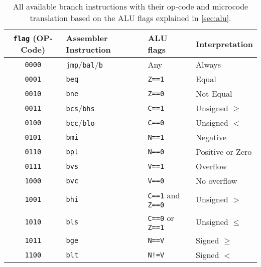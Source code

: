 \begin{table}
  \centering
  \renewcommand{\arraystretch}{1.25}
  \caption{All available branch instructions with their op-code and microcode translation based on the \gls{ALU} flags explained in \cref{sec:alu}.}
  \label{tab:mc_flagMeanings}
  \begin{tabularx}{\textwidth}{ |c|l|l|X| }
    \hline
    \texttt{flag} (OP-Code) & Assembler Instruction                & \gls{ALU} flags                 & Interpretation   \\\hline\hline
    \texttt{0000}           & \texttt{jmp}/\texttt{bal}/\texttt{b} & Any                             & Always           \\\hline
    \texttt{0001}           & \texttt{beq}                         & \texttt{Z==1}                   & Equal            \\\hline
    \texttt{0010}           & \texttt{bne}                         & \texttt{Z==0}                   & Not Equal        \\\hline
    \texttt{0011}           & \texttt{bcs}/\texttt{bhs}            & \texttt{C==1}                   & Unsigned $\geq$  \\\hline
    \texttt{0100}           & \texttt{bcc}/\texttt{blo}            & \texttt{C==0}                   & Unsigned $<$     \\\hline
    \texttt{0101}           & \texttt{bmi}                         & \texttt{N==1}                   & Negative         \\\hline
    \texttt{0110}           & \texttt{bpl}                         & \texttt{N==0}                   & Positive or Zero \\\hline
    \texttt{0111}           & \texttt{bvs}                         & \texttt{V==1}                   & Overflow         \\\hline
    \texttt{1000}           & \texttt{bvc}                         & \texttt{V==0}                   & No overflow      \\\hline
    \texttt{1001}           & \texttt{bhi}                         & \texttt{C==1} and \texttt{Z==0} & Unsigned $>$     \\\hline
    \texttt{1010}           & \texttt{bls}                         & \texttt{C==0} or \texttt{Z==1}  & Unsigned $\leq$  \\\hline
    \texttt{1011}           & \texttt{bge}                         & \texttt{N==V}                   & Signed $\geq$    \\\hline
    \texttt{1100}           & \texttt{blt}                         & \texttt{N!=V}                   & Signed $<$       \\\hline

\end{tabularx}
\end{table}
